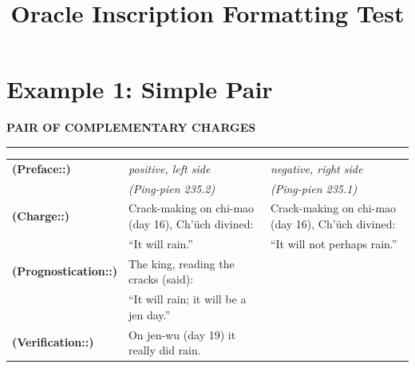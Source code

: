 \documentclass[11pt,a4paper]{book}
\title{Oracle Inscription Formatting Test}
\makeatletter
\newcommand{\inscriptionref}[1]{\textit{(#1)}}
\newcommand{\inscriptionlabel}[1]{\textbf{(#1:)}}
\newcommand{\inscriptionside}[1]{\emph{#1}}
\newcommand{\inscriptionsection}[1]{%
  \par\vspace{0.5\baselineskip}
  \noindent\hfill\textbf{\MakeUppercase{#1}}\hfill\par
  \noindent\rule{\textwidth}{0.5pt}\par
  \vspace{0.3\baselineskip}
}
\newenvironment{inscriptionpair}
{%
  \par\medskip
  \noindent\begin{tabularx}{\textwidth}{@{}p{1.2cm}XX@{}}
  \hline
}
{%
  \hline
  \end{tabularx}
  \medskip
}
\makeatother
\begin{document}
\maketitle

\section*{Example 1: Simple Pair}

\inscriptionsection{PAIR OF COMPLEMENTARY CHARGES}

\begin{inscriptionpair}
\inscriptionlabel{Preface:} & \inscriptionside{positive, left side} & \inscriptionside{negative, right side} \\
& \inscriptionref{Ping-pien 235.2} & \inscriptionref{Ping-pien 235.1} \\
\hline
\inscriptionlabel{Charge:} & Crack-making on chi-mao (day 16), Ch'üch divined: & Crack-making on chi-mao (day 16), Ch'üch divined: \\
& ``It will rain.'' & ``It will not perhaps rain.'' \\
\hline
\inscriptionlabel{Prognostication:} & The king, reading the cracks (said): & \\
& ``It will rain; it will be a jen day.'' & \\
\hline
\inscriptionlabel{Verification:} & On jen-wu (day 19) it really did rain. & \\
\end{inscriptionpair}
\end{document}
